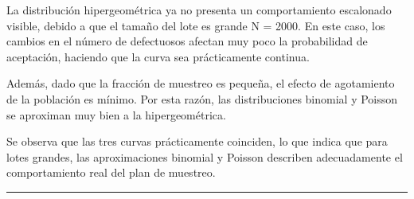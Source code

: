 \documentclass[
  12pt,
]{article}
\begin{document}
La distribución hipergeométrica ya no presenta un comportamiento
escalonado visible, debido a que el tamaño del lote es grande N = 2000.
En este caso, los cambios en el número de defectuosos afectan muy poco
la probabilidad de aceptación, haciendo que la curva sea prácticamente
continua.

Además, dado que la fracción de muestreo es pequeña, el efecto de
agotamiento de la población es mínimo. Por esta razón, las
distribuciones binomial y Poisson se aproximan muy bien a la
hipergeométrica.

Se observa que las tres curvas prácticamente coinciden, lo que indica
que para lotes grandes, las aproximaciones binomial y Poisson describen
adecuadamente el comportamiento real del plan de muestreo.

\begin{center}\rule{0.5\linewidth}{0.5pt}\end{center}
\end{document}
